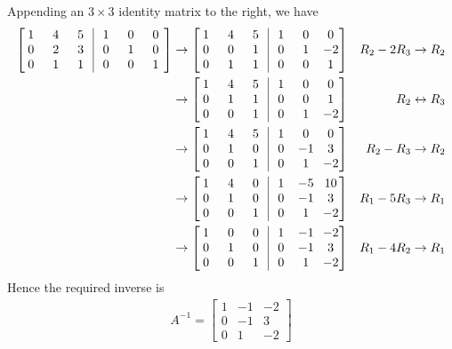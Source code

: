 \begin{solution}
Appending an $3 \times 3$ identity matrix to the right, we have
\begin{align*}
\left[\begin{array}{@{}wc{10pt}wc{10pt}wc{10pt}|wc{10pt}wc{10pt}wc{10pt}@{\,}}
1 & 4 & 5 & 1 & 0 & 0 \\
0 & 2 & 3 & 0 & 1 & 0 \\
0 & 1 & 1 & 0 & 0 & 1
\end{array}\right] 
& \to
\left[\begin{array}{@{}wc{10pt}wc{10pt}wc{10pt}|wc{10pt}wc{10pt}wc{10pt}@{\,}}
1 & 4 & 5 & 1 & 0 & 0 \\
0 & 0 & 1 & 0 & 1 & -2 \\
0 & 1 & 1 & 0 & 0 & 1
\end{array}\right] & R_2 - 2R_3 \to R_2 \\
& \to
\left[\begin{array}{@{}wc{10pt}wc{10pt}wc{10pt}|wc{10pt}wc{10pt}wc{10pt}@{\,}}
1 & 4 & 5 & 1 & 0 & 0 \\
0 & 1 & 1 & 0 & 0 & 1 \\
0 & 0 & 1 & 0 & 1 & -2 
\end{array}\right] & R_2 \leftrightarrow R_3 \\
& \to
\left[\begin{array}{@{}wc{10pt}wc{10pt}wc{10pt}|wc{10pt}wc{10pt}wc{10pt}@{\,}}
1 & 4 & 5 & 1 & 0 & 0 \\
0 & 1 & 0 & 0 & -1 & 3 \\
0 & 0 & 1 & 0 & 1 & -2 
\end{array}\right] & R_2 - R_3 \to R_2 \\
& \to
\left[\begin{array}{@{}wc{10pt}wc{10pt}wc{10pt}|wc{10pt}wc{10pt}wc{10pt}@{\,}}
1 & 4 & 0 & 1 & -5 & 10 \\
0 & 1 & 0 & 0 & -1 & 3 \\
0 & 0 & 1 & 0 & 1 & -2 
\end{array}\right] & R_1 - 5R_3 \to R_1 \\
& \to
\left[\begin{array}{@{}wc{10pt}wc{10pt}wc{10pt}|wc{10pt}wc{10pt}wc{10pt}@{\,}}
1 & 0 & 0 & 1 & -1 & -2 \\
0 & 1 & 0 & 0 & -1 & 3 \\
0 & 0 & 1 & 0 & 1 & -2 
\end{array}\right] & R_1 - 4R_2 \to R_1 
\end{align*}
Hence the required inverse is
\begin{align*}
A^{-1} =
\begin{bmatrix}
1 & -1 & -2 \\
0 & -1 & 3 \\
0 & 1 & -2 
\end{bmatrix}    
\end{align*}
\end{solution}
